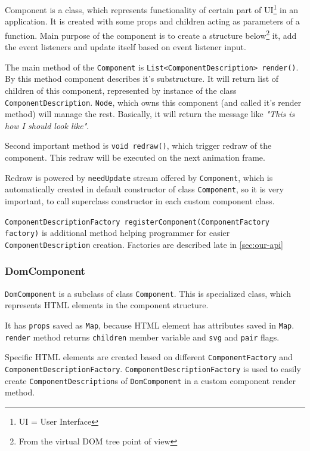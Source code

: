 \documentclass[oneside, 12pt]{book}
\newcommand*{\fullref}[1]{\hyperref[{#1}]{\autoref*{#1} \nameref*{#1}}}
\begin{document}
      Component is a class, which represents functionality of certain part of UI\footnote{UI = User Interface} in an application.
      It is created with some props and children acting as parameters of a function. 
      Main purpose of the component is to create a structure below\footnote{From the virtual DOM tree point of view} it, 
      add the event listeners and update itself based on event listener input.

      The main method of the \texttt{Component} is \texttt{List<ComponentDescription> render()}. 
      By this method component describes it's substructure.
      It will return list of children of this component, represented by instance of the class \texttt{ComponentDescription}. 
      \texttt{Node}, which owns this component (and called it's render method) will manage the rest.
      Basically, it will return the message like \textit{"This is how I should look like"}.

      Second important method is \texttt{void redraw()}, which trigger redraw of the component. 
      This redraw will be executed on the next animation frame. 

      Redraw is powered by \texttt{needUpdate} stream offered by \texttt{Component}, 
      which is automatically created in default constructor of class \texttt{Component}, 
      so it is very important, to call superclass constructor in each custom component class.

      \texttt{ComponentDescriptionFactory registerComponent(ComponentFactory factory)} is additional method helping programmer 
      for easier \texttt{ComponentDescription} creation. 
      Factories are described late in \fullref{sec:our-api}
      
    \subsubsection{DomComponent}\label{subsubsec:our-architecture-core-dom-component}
      \texttt{DomComponent} is a subclass of class \texttt{Component}. 
      This is specialized class, which represents HTML elements in the component structure.

      It has \texttt{props} saved as \texttt{Map}, because HTML element has attributes saved in \texttt{Map}.
      \texttt{render} method returns \texttt{children} member variable and \texttt{svg} and \texttt{pair} flags.

      Specific HTML elements are created based on different \texttt{ComponentFactory} and \texttt{ComponentDescriptionFactory}.
      \texttt{ComponentDescriptionFactory} is used to easily create \texttt{ComponentDescription}s of \texttt{DomComponent} in a custom component render method. 
\end{document}
